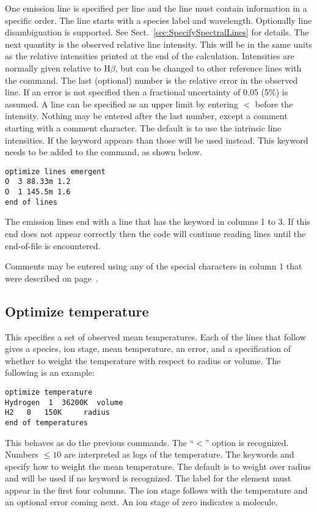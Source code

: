 One emission line is specified per line and the line must contain
information in a specific order.
The line starts with a species label and wavelength.
Optionally line disambiguation is supported. See Sect.~\ref{sec:SpecifySpectralLines} for details.
The next quantity is the observed relative line intensity.
This will be in the same units as the relative intensities printed at the
end of the calculation.
Intensities are normally given relative to H$\beta$,
but can be changed to other reference lines with the
 command.
The last (optional) number is the
relative error in the observed line.
If an error is not specified then
a fractional uncertainty of 0.05 (5\%) is assumed.
A line can be specified
as an upper limit by entering $<$ before the intensity.
Nothing may be entered after the last number, except a comment starting with a comment character.
The default is to use the intrinsic line intensities.
If the keyword  appears than
those will be used instead. This keyword needs to be added
to the  command, as shown below.
\begin{verbatim}
optimize lines emergent
O  3 88.33m 1.2
O  1 145.5m 1.6
end of lines
\end{verbatim}

The emission lines end with a line that has the keyword
 in columns 1 to 3.
If this end does not appear correctly then the code will continue
reading lines until the end-of-file is encountered.

Comments may be entered using any of the special characters in column
1 that were described on page~\pageref{sec:CommentsInInput}.

\subsection{Optimize temperature}

This specifies a set of observed mean temperatures.
Each of the lines
that follow gives a species, ion stage, mean temperature, an error,
and a specification of whether to weight the temperature with
respect to radius or volume.
The following is an example:
\begin{verbatim}
optimize temperature
Hydrogen  1  36200K  volume
H2   0   150K     radius
end of temperatures
\end{verbatim}

This behaves as do the previous commands.
The ``$<$'' option is
recognized.
Numbers $\le 10$ are interpreted as logs of the temperature.
The
keywords  and  specify how to
weight the mean temperature.
The default is to weight over radius and will be used if no keyword is
recognized.
The label for the element must appear in the first four columns.
The ion stage follows with the temperature and an optional error coming
next.
An ion stage of zero indicates a molecule.

